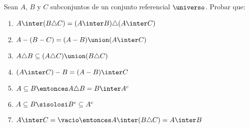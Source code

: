 \begin{enunciado}{\ejercicio}

  Sean $A$, $B$ y $C$ subconjuntos de un conjunto referencial $\universo$. Probar que:
  \begin{multicols}{2}
    \begin{enumerate}[label=\roman*)]
      \item $A \inter (B \triangle C) = (A \inter B) \triangle (A \inter C)$
      \item $A - (B - C) = (A-B) \union (A \inter C)$
      \item $A \triangle B \subseteq (A \triangle C) \union (B \triangle C)$
      \item $(A \inter C ) - B = (A - B) \inter C$
      \item $A \subseteq B \entonces A \triangle B = B \inter A^c$
      \item $A \subseteq B \sisolosi B^c \subseteq A^c$
      \item $A \inter C = \vacio \entonces A \inter (B \triangle C) = A \inter B$
    \end{enumerate}
  \end{multicols}

\end{enunciado}


